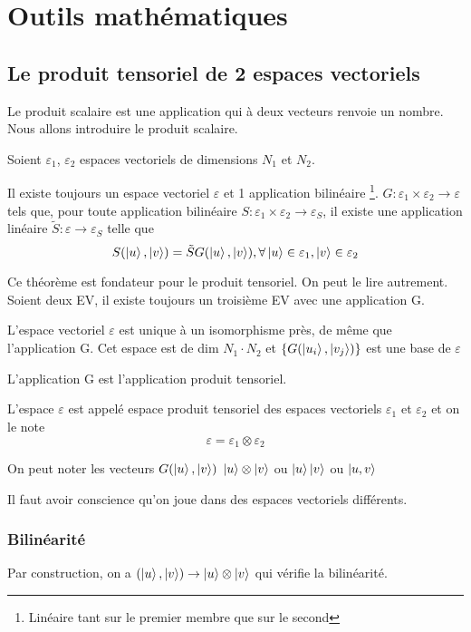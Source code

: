 \chapter{Outils mathématiques}
\section{Le produit tensoriel de 2 espaces vectoriels}

Le produit scalaire est une application qui à deux vecteurs renvoie un nombre. Nous allons introduire le produit scalaire.

Soient $\varepsilon_1$, $\varepsilon_2$ espaces vectoriels de dimensions $N_1$ et $N_2$.

\begin{thm}
Il existe toujours un espace vectoriel $\varepsilon$ et 1 application bilinéaire \footnote{Linéaire tant sur le premier membre que sur le second}. $G: \varepsilon_1 \times \varepsilon_2 \rightarrow \varepsilon$ tels que, pour toute application bilinéaire $S: \varepsilon_1 \times \varepsilon_2 \rightarrow \varepsilon_S$, il existe une application linéaire $\tilde{S} : \varepsilon \rightarrow \varepsilon_S$ telle que 
$$ S(\ket{u},\ket{v})  = \tilde{S}G(\ket{u},\ket{v}), \forall \ket{u} \in \varepsilon_1,\ket{v} \in \varepsilon_2$$
\end{thm}
Ce théorème est fondateur pour le produit tensoriel. On peut le lire autrement. Soient deux EV, il existe toujours un troisième EV avec une application G.
\begin{thm}
	L'espace vectoriel $\varepsilon$ est unique à un isomorphisme près, de même que l'application G. Cet espace est de dim $N_1 \cdot N_2$ et $ \{ G(\ket{u_i},\ket{v_j}) \} $ est une base de $ \varepsilon $
\end{thm}

L'application G est l'application produit tensoriel.

\begin{definition}
	L'espace $\varepsilon$ est appelé espace produit tensoriel des espaces vectoriels $\varepsilon_1$ et $\varepsilon_2$ et on le note
	$$ \varepsilon = \varepsilon_1 \otimes \varepsilon_2$$
\end{definition}

On peut noter les vecteurs $G(\ket{u},\ket{v})$ $\ket{u}\otimes\ket{v}$ ou $\ket{u}\ket{v}$ ou $\ket{u,v}$

Il faut avoir conscience qu'on joue dans des espaces vectoriels différents.
\subsection{Bilinéarité}
Par construction, on a $(\ket{u},\ket{v}) \rightarrow \ket{u}\otimes\ket{v}$ qui vérifie la bilinéarité.

